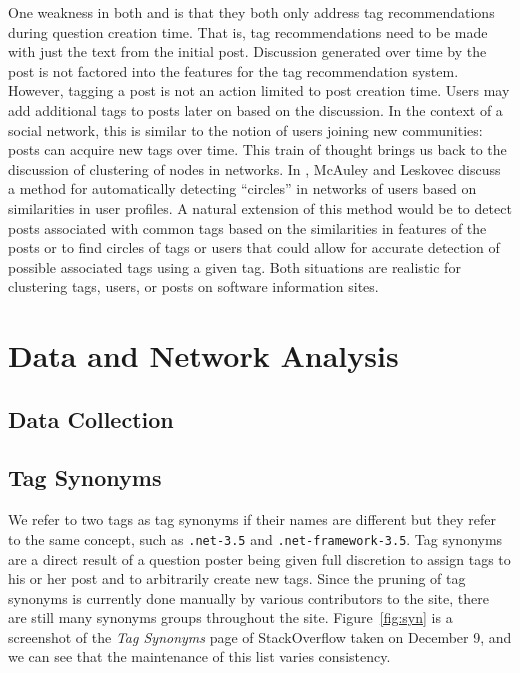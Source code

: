 \documentclass[10pt]{IEEEtran}
\begin{document}
One weakness in both \cite{1} and \cite{5} is that they both only address tag recommendations during question creation time. That is, tag recommendations need to be made with just the text from the initial post. Discussion generated over time by the post is not factored into the features for the tag recommendation system. However, tagging a post is not an action limited to post creation time. Users may add additional tags to posts later on based on the discussion. In the context of a social network, this is similar to the notion of users joining new communities: posts can acquire new tags over time. This train of thought brings us back to the discussion of clustering of nodes in networks. In \cite{2}, McAuley and Leskovec discuss a method for automatically detecting ``circles'' in networks of users based on similarities in user profiles. A natural extension of this method would be to detect posts associated with common tags based on the similarities in features of the posts or to find circles of tags or users that could allow for accurate detection of possible associated tags using a given tag. Both situations are realistic for clustering tags, users, or posts on software information sites.

\section{Data and Network Analysis}

\subsection{Data Collection}

\subsection{Tag Synonyms}

We refer to two tags as tag synonyms if their names are different but they refer to the same concept, such as \texttt{.net-3.5} and \texttt{.net-framework-3.5}. Tag synonyms are a direct result of a question poster being given full discretion to assign tags to his or her post and to arbitrarily create new tags. Since the pruning of tag synonyms is currently done manually by various contributors to the site, there are still many synonyms groups throughout the site. Figure~\ref{fig:syn} is a screenshot of the \textit{Tag Synonyms} page of StackOverflow taken on December 9, and we can see that the maintenance of this list varies consistency.\\
\end{document}

